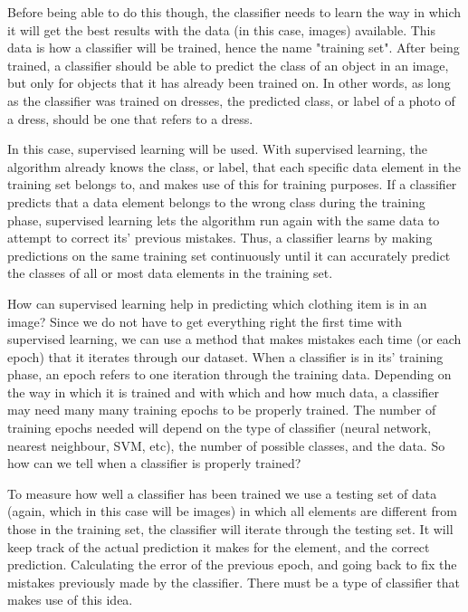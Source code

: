 \documentclass[12pt]{report} %
\begin{document}
	Before being able to do this though, the classifier needs to learn the way in which it will get the best results with the data (in this case, images) available. This data is how a classifier will be trained, hence the name "training set". After being trained, a classifier should be able to predict the class of an object in an image, but only for objects that it has already been trained on. In other words, as long as the classifier was trained on dresses, the predicted class, or label of a photo of a dress, should be one that refers to a dress. 
	
	In this case, supervised learning will be used. With supervised learning, the algorithm already knows the class, or label, that each specific data element in the training set belongs to, and makes use of this for training purposes. If a classifier predicts that a data element belongs to the wrong class during the training phase, supervised learning lets the algorithm run again with the same data to attempt to correct its' previous mistakes\cite{aurelienMachineLearning}. Thus, a classifier learns by making predictions on the same training set continuously until it can accurately predict the classes of all or most data elements in the training set. 
	
	How can supervised learning help in predicting which clothing item is in an image? Since we do not have to get everything right the first time with supervised learning, we can use a method that makes mistakes each time (or each epoch) that it iterates through our dataset. When a classifier is in its' training phase, an epoch refers to one iteration through the training data. Depending on the way in which it is trained and with which and how much data, a classifier may need many many training epochs to be properly trained. The number of training epochs needed will depend on the  type of classifier (neural network, nearest neighbour, SVM, etc), the number of possible classes, and the data. So how can we tell when a classifier is properly trained? 
	
	To measure how well a classifier has been trained we use a testing set of data (again, which in this case will be images) in which all elements are different from those in the training set, the classifier will iterate through the testing set. It will keep track of the actual prediction it makes for the element, and the correct prediction. Calculating the error of the previous epoch, and going back to fix the mistakes previously made by the classifier. There must be a type of classifier that makes use of this idea.
\end{document}
